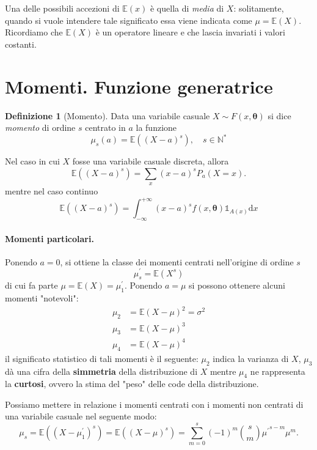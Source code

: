 \documentclass[fontsize=11pt,paper=A4,oneside,index=totoc,hyperref]{book}
\theoremstyle{definition}
\newtheorem{dfn}{Definizione}[]
\theoremstyle{plain}
\newcommand{\Asp}{\mathbb{E}}
\newcommand{\Ind}[1]{\mathbb{1}_{#1}}
\begin{document}
Una delle possibili accezioni di \(\Asp(x)\) è quella di \emph{media} di \(X\): solitamente, quando si vuole intendere tale significato essa viene indicata come \(\mu = \Asp(X)\). Ricordiamo che \(\Asp(X)\) è un operatore lineare e che lascia invariati i valori costanti.


\section{Momenti. Funzione generatrice}
\begin{dfn}[Momento]
  Data una variabile casuale \(X \sim F(x, {\boldsymbol{\theta}})\) si dice \emph{momento} di ordine \(s\) centrato in \(a\) la funzione
  \[
  \mu_s(a) = \Asp((X - a)^s),\quad s \in \mathbb{N}^{*}
  \]
\end{dfn}
Nel caso in cui \(X\) fosse una variabile casuale discreta, allora
\[
\Asp((X-a)^s) = \sum_{x}(x-a)^sP_a(X = x).
\]
mentre nel caso continuo
\[
\Asp((X-a)^s) = \int_{-\infty}^{+\infty}(x-a)^s f(x, {\boldsymbol{\theta}}) \Ind{A(x)}\mathrm{d}x
\]

\paragraph{Momenti particolari.} Ponendo \(a = 0\), si ottiene la classe dei momenti centrati nell'origine di ordine \(s\)
\[
\mu_s^\prime = \Asp(X^s)
\]
di cui fa parte \(\mu = \Asp(X) = \mu_1^\prime\). Ponendo \(a = \mu\) si possono ottenere alcuni momenti "notevoli":
\begin{align*}
  \mu_2 &= \Asp(X - \mu)^2 = \sigma^2 \\
  \mu_3 &= \Asp(X - \mu)^3 \\
  \mu_4 &= \Asp(X - \mu)^4
\end{align*}
il significato statistico di tali momenti è il seguente: \(\mu_2\) indica la varianza di \(X\), \(\mu_3\) dà una cifra della {\bf simmetria} della distribuzione di \(X\) mentre \(\mu_4\) ne rappresenta la {\bf curtosi}, ovvero la stima del "peso" delle code della distribuzione.

Possiamo mettere in relazione i momenti centrati con i momenti non centrati di una variabile casuale nel seguente modo:
\begin{equation}
  \mu_s = \Asp((X - \mu_1^\prime)^s) = \Asp((X - \mu)^s) = \sum_{m=0}^s(-1)^m
\binom{s}{m}{\mu^\prime}^{s - m}\mu^m.
\end{equation}
\end{document}
